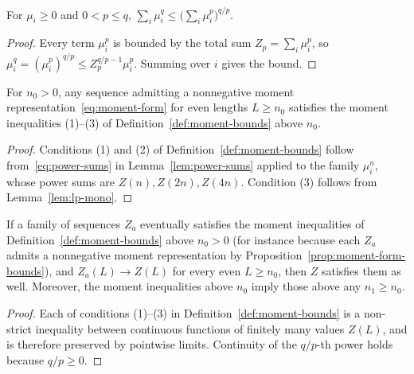 \begin{lemma}
  \label{lem:lp-mono}
  \leanok
  For \(\mu_i \ge 0\) and \(0 < p \le q\), \(\sum_i \mu_i^q \le \bigl(\sum_i \mu_i^p\bigr)^{q/p}\).
\end{lemma}
\begin{proof}
  \leanok
  Every term \(\mu_i^p\) is bounded by the total sum \(Z_p = \sum_i \mu_i^p\), so
  \(\mu_i^q = (\mu_i^p)^{q/p} \le Z_p^{q/p - 1} \mu_i^p\). Summing over \(i\) gives the bound.
\end{proof}

\begin{proposition}
  \label{prop:moment-form-bounds}
  \leanok
  For \(n_0 > 0\), any sequence admitting a nonnegative moment representation~\eqref{eq:moment-form}
  for even lengths \(L \ge n_0\) satisfies the moment inequalities (1)--(3) of
  Definition~\ref{def:moment-bounds} above \(n_0\).
\end{proposition}
\begin{proof}
  \leanok
  Conditions (1) and (2) of Definition~\ref{def:moment-bounds} follow from~\eqref{eq:power-sums} in
  Lemma~\ref{lem:power-sums} applied to the family \(\mu_i^n\), whose power sums are
  \(Z(n), Z(2n), Z(4n)\). Condition (3) follows from Lemma~\ref{lem:lp-mono}.
\end{proof}

\begin{lemma}
  \label{lem:moment-bounds-limit}
  \leanok
  If a family of sequences \(Z_a\) eventually satisfies the moment inequalities of
  Definition~\ref{def:moment-bounds} above \(n_0 > 0\) (for instance because each \(Z_a\) admits a
  nonnegative moment representation by Proposition~\ref{prop:moment-form-bounds}), and
  \(Z_a(L) \to Z(L)\) for every even \(L \ge n_0\), then \(Z\) satisfies them as well. Moreover,
  the moment inequalities above \(n_0\) imply those above any \(n_1 \ge n_0\).
\end{lemma}
\begin{proof}
  \leanok
  Each of conditions (1)--(3) in Definition~\ref{def:moment-bounds} is a non-strict inequality
  between continuous functions of finitely many values \(Z(L)\), and is therefore preserved by
  pointwise limits. Continuity of the \(q/p\)-th power holds because \(q/p \ge 0\).
\end{proof}


